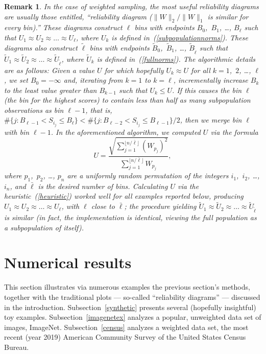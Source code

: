 \documentclass{article}
\newtheorem{remark1}[theorem]{Remark}
\newenvironment{remark}{\begin{remark1} \rm}{\end{remark1}}
\begin{document}
\begin{remark}
\label{equierrs}
In the case of weighted sampling, the most useful reliability diagrams
are usually those entitled,
``reliability diagram ($\|W\|_2/\|W\|_1$ is similar for every bin).''
These diagrams construct $\ell$ bins with endpoints
$B_0$,~$B_1$, \dots, $B_{\ell}$ such that
$U_1 \approx U_2 \approx \dots \approx U_{\ell}$,
where $U_k$ is defined in~(\ref{subpopulationnorms}).
These diagrams also construct $\tilde{\ell}$ bins with endpoints
$\tilde{B}_0$,~$\tilde{B}_1$, \dots, $\tilde{B}_{\tilde{\ell}}$ such that
$\tilde{U}_1 \approx \tilde{U}_2 \approx \dots
\approx \tilde{U}_{\tilde{\ell}}$,
where $\tilde{U}_k$ is defined in~(\ref{fullnorms}).
The algorithmic details are as follows:
Given a value $U$ for which hopefully $U_k \approx U$
for all $k = 1$,~$2$, \dots, $\ell$,
we set $B_0 = -\infty$ and, iterating from $k = 1$ to $k = \ell$,
incrementally increase $B_k$ to the least value greater than $B_{k-1}$
such that $U_k \le U$.
If this causes the bin $\ell$ (the bin for the highest scores)
to contain less than half as many subpopulation observations as bin $\ell-1$,
that is, $\#\{j : B_{\ell-1} < S_{i_j} \le B_{\ell}\}
< \#\{j : B_{\ell-2} < S_{i_j} \le B_{\ell-1}\} / 2$,
then we merge bin $\ell$ with bin $\ell-1$.
In the aforementioned algorithm, we computed $U$ via the formula
%
\begin{equation}
\label{heuristic}
U = \frac{\sqrt{\sum_{j = 1}^{\lfloor n / \bar{\ell} \rfloor} (W_{p_j})^2}}
         {\sum_{j = 1}^{\lfloor n / \bar{\ell} \rfloor} W_{p_j}},
\end{equation}
%
where $p_1$,~$p_2$, \dots, $p_n$ are a uniformly random permutation
of the integers $i_1$,~$i_2$, \dots, $i_n$,
and $\bar{\ell}$ is the desired number of bins.
Calculating $U$ via the heuristic~(\ref{heuristic}) worked well
for all examples reported below,
producing $U_1 \approx U_2 \approx \dots \approx U_\ell$,
with $\ell$ close to $\bar{\ell}$; the procedure yielding $\tilde{U}_1
\approx \tilde{U}_2 \approx \dots \approx \tilde{U}_{\tilde{\ell}}$ is similar
(in fact, the implementation is identical, viewing the full population
as a subpopulation of itself).
\end{remark}



\section{Numerical results}
\label{results}


This section illustrates via numerous examples
the previous section's methods,
together with the traditional plots --- so-called ``reliability diagrams'' ---
discussed in the introduction.
Subsection~\ref{synthetic} presents several (hopefully insightful)
toy examples.
Subsection~\ref{imagenetex} analyzes a popular, unweighted data set of images,
ImageNet.
Subsection~\ref{census} analyzes a weighted data set,
the most recent (year 2019) American Community Survey
of the United States Census Bureau.
\end{document}

